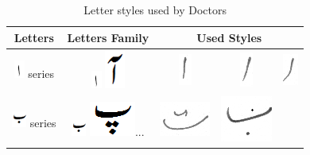 \begin{table}[h]
\centering
\caption{Letter styles used by Doctors}\label{tab6-doc}
\begin{tabular}{@{}ccccc@{}}
\hline
Letters	& Letters Family & \multicolumn{3}{c}{\textbf{Used Styles}} \\ \hline
\includegraphics[scale=0.35]{alif.png} series & \includegraphics[scale=0.35]{alif.png} \includegraphics[scale=0.20]{alif_mad_orig.png} & \includegraphics[scale=0.25]{1.png} &
\includegraphics[scale=0.25]{2.png} &
\includegraphics[scale=0.25]{3.png} \\ 
\hline
\includegraphics[scale=0.35]{Bay.png} series & \includegraphics[scale=0.45]{Bay.png} \includegraphics[scale=0.25]{pay.png}... & \includegraphics[scale=0.20]{4} &
\includegraphics[scale=0.15]{5} &

\end{tabular}
\end{table}
